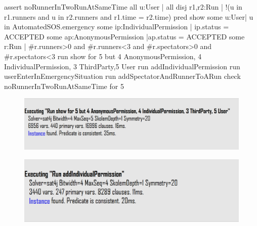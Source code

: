\documentclass[a4paper]{article}
\begin{document}
{\newline 
\newline assert noRunnerInTwoRunAtSameTime{
\newline 	all u:User | all disj r1,r2:Run | !(u in r1.runners  and u in r2.runners and r1.time = r2.time)
\newline }
\newline 
\newline 
\newline pred show {
\newline 	some u:User| u in AutomatedSOS.emergency 
\newline 	some ip:IndividualPermission | ip.status = ACCEPTED 
\newline 	some ap:AnonymousPermission |ap.status = ACCEPTED
\newline 	some r:Run | #r.runners>0 and #r.runners<3 and #r.spectators>0 and #r.spectators<3
\newline }
\newline 
\newline run show for 5 but 4 AnonymousPermission, 4 IndividualPermission, 3 ThirdParty,5 User
\newline run addIndividualPermission
\newline run  userEnterInEmergencySituation
\newline run addSpectatorAndRunnerToARun
\newline check noRunnerInTwoRunAtSameTime for 5}
\newline 


\begin{figure}[H]
    \centering
    \includegraphics[width=\textwidth]{alloyResult1}
\end{figure}

\begin{figure}[H]
    \centering
    \includegraphics[width=\textwidth]{alloyResult2}
\end{figure}
\end{document}
